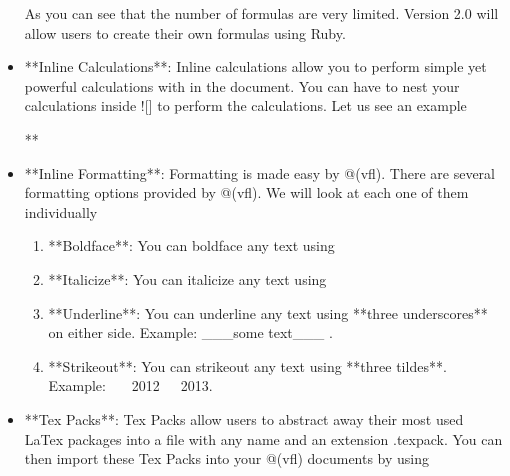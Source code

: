 \documentclass{article}
\begin{document}
\begin{itemize}

As you can see that the number of formulas are very limited. Version 2.0 will allow users to create their own formulas using Ruby. 

\item **Inline Calculations**: Inline calculations allow you to perform simple yet powerful calculations with in the document. You can have to nest your calculations inside ![] to perform the calculations. Let us see an example \vspace{5pt}

**%

\item **Inline Formatting**: Formatting is made easy by @(vfl). There are several formatting options provided by @(vfl). We will look at each one of them individually

\begin{enumerate}

\item **Boldface**: You can boldface any text using %

\item **Italicize**: You can italicize any text using %

\item **Underline**: You can underline any text using **three underscores** on either side. Example: ___some text___ .

\item **Strikeout**: You can strikeout any text using **three tildes**. Example: ~~~2012~~~2013. 

\end{enumerate}

\item **Tex Packs**:  Tex Packs allow users to abstract away their most used LaTex packages into a file with any name and an extension .texpack. You can then import these Tex Packs into your @(vfl) documents by using %


\end{itemize}
\end{document}
